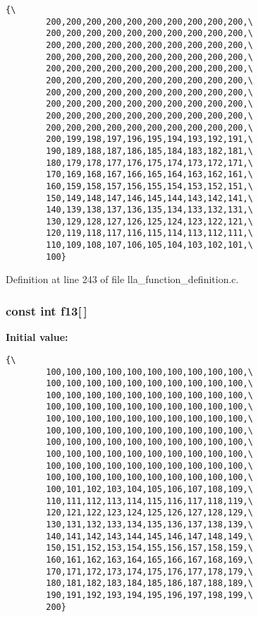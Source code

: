\footnotesize\begin{verbatim}{\
        200,200,200,200,200,200,200,200,200,200,\
        200,200,200,200,200,200,200,200,200,200,\
        200,200,200,200,200,200,200,200,200,200,\
        200,200,200,200,200,200,200,200,200,200,\
        200,200,200,200,200,200,200,200,200,200,\
        200,200,200,200,200,200,200,200,200,200,\
        200,200,200,200,200,200,200,200,200,200,\
        200,200,200,200,200,200,200,200,200,200,\
        200,200,200,200,200,200,200,200,200,200,\
        200,200,200,200,200,200,200,200,200,200,\
        200,199,198,197,196,195,194,193,192,191,\
        190,189,188,187,186,185,184,183,182,181,\
        180,179,178,177,176,175,174,173,172,171,\
        170,169,168,167,166,165,164,163,162,161,\
        160,159,158,157,156,155,154,153,152,151,\
        150,149,148,147,146,145,144,143,142,141,\
        140,139,138,137,136,135,134,133,132,131,\
        130,129,128,127,126,125,124,123,122,121,\
        120,119,118,117,116,115,114,113,112,111,\
        110,109,108,107,106,105,104,103,102,101,\
        100}
\end{verbatim}\normalsize 


Definition at line 243 of file lla\_\-function\_\-definition.c.
\subsubsection{\setlength{\rightskip}{0pt plus 5cm}const int {\bf f13}[$\,$]}\label{lla__function__definition_8c_a12}


{\bf Initial value:}

\footnotesize\begin{verbatim}{\
        100,100,100,100,100,100,100,100,100,100,\
        100,100,100,100,100,100,100,100,100,100,\
        100,100,100,100,100,100,100,100,100,100,\
        100,100,100,100,100,100,100,100,100,100,\
        100,100,100,100,100,100,100,100,100,100,\
        100,100,100,100,100,100,100,100,100,100,\
        100,100,100,100,100,100,100,100,100,100,\
        100,100,100,100,100,100,100,100,100,100,\
        100,100,100,100,100,100,100,100,100,100,\
        100,100,100,100,100,100,100,100,100,100,\
        100,101,102,103,104,105,106,107,108,109,\
        110,111,112,113,114,115,116,117,118,119,\
        120,121,122,123,124,125,126,127,128,129,\
        130,131,132,133,134,135,136,137,138,139,\
        140,141,142,143,144,145,146,147,148,149,\
        150,151,152,153,154,155,156,157,158,159,\
        160,161,162,163,164,165,166,167,168,169,\
        170,171,172,173,174,175,176,177,178,179,\
        180,181,182,183,184,185,186,187,188,189,\
        190,191,192,193,194,195,196,197,198,199,\
        200}
\end{verbatim}\normalsize 


